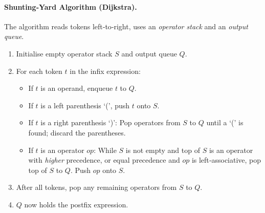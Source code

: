 \documentclass[11pt]{article}
\begin{document}
\paragraph{Shunting‑Yard Algorithm (Dijkstra).}
The algorithm reads tokens left‑to‑right, uses an \emph{operator stack} and an \emph{output queue}.

\begin{methode}
\begin{enumerate}
\item Initialise empty operator stack $S$ and output queue $Q$.
\item For each token $t$ in the infix expression:
  \begin{itemize}
  \item If $t$ is an operand, enqueue $t$ to $Q$.
  \item If $t$ is a left parenthesis `(', push $t$ onto $S$.
  \item If $t$ is a right parenthesis `)':
        Pop operators from $S$ to $Q$ until a `(' is found; discard the parentheses.
  \item If $t$ is an operator $op$:
        While $S$ is not empty and top of $S$ is an operator with \emph{higher} precedence, or equal precedence and $op$ is left‑associative, pop top of $S$ to $Q$.
        Push $op$ onto $S$.
  \end{itemize}
\item After all tokens, pop any remaining operators from $S$ to $Q$.
\item $Q$ now holds the postfix expression.
\end{enumerate}
\end{methode}
\end{document}
